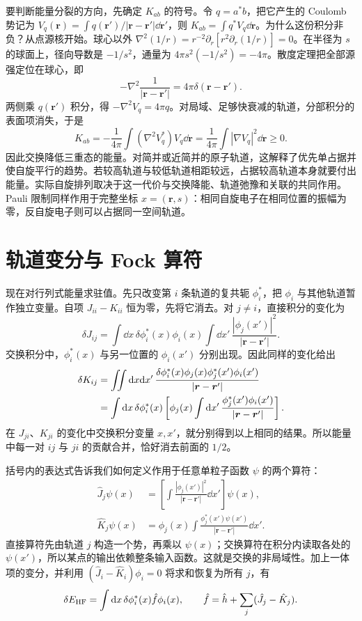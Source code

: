 要判断能量分裂的方向，先确定 $K_{ab}$ 的符号。令 $q=a^*b$，把它产生的 Coulomb 势记为 $V_q(\bm r)=\int q(\bm r')/|\bm r-\bm r'|\dd\bm r'$，则 $K_{ab}=\int q^*V_q\dd\bm r$。为什么这份积分非负？从点源核开始。球心以外 $\nabla^2(1/r)=r^{-2}\partial_r[r^2\partial_r(1/r)]=0$。在半径为 $s$ 的球面上，径向导数是 $-1/s^2$，通量为 $4\pi s^2(-1/s^2)=-4\pi$。散度定理把全部源强定位在球心，即
\begin{equation}\label{hf:coulomb-kernel}
 -\nabla^2\frac{1}{|\bm r-\bm r'|}=4\pi\delta(\bm r-\bm r').
\end{equation}
两侧乘 $q(\bm r')$ 积分，得 $-\nabla^2V_q=4\pi q$。对局域、足够快衰减的轨道，分部积分的表面项消失，于是
\begin{equation}
K_{ab}=-\frac1{4\pi}\int(\nabla^2V_q^*)V_q\dd\bm r
=\frac1{4\pi}\int|\nabla V_q|^2\dd\bm r\ge0.
\end{equation}
因此交换降低三重态的能量。对简并或近简并的原子轨道，这解释了优先单占据并使自旋平行的趋势。若较高轨道与较低轨道相距较远，占据较高轨道本身就要付出能量。实际自旋排列取决于这一代价与交换降能、轨道弛豫和关联的共同作用。Pauli 限制同样作用于完整坐标 $x=(\bm r,s)$：相同自旋电子在相同位置的振幅为零，反自旋电子则可以占据同一空间轨道。

\section{轨道变分与 Fock 算符}
现在对行列式能量求驻值。先只改变第 $i$ 条轨道的复共轭 $\phi_i^*$，把 $\phi_i$ 与其他轨道暂作独立变量。自项 $J_{ii}-K_{ii}$ 恒为零，先将它消去。对 $j\ne i$，直接积分的变化为
\begin{equation}
\delta J_{ij}=\int\dd x\,\delta\phi_i^*(x)\phi_i(x)
\int\dd x'\,\frac{|\phi_j(x')|^2}{|\bm r-\bm r'|}.
\end{equation}
交换积分中，$\phi_i^*(x)$ 与另一位置的 $\phi_i(x')$ 分别出现。因此同样的变化给出
\begin{align}
\delta K_{ij}
&=\iint\mathrm{d} x\mathrm{d} x'\,
\frac{\delta\phi_i^*(x)\phi_j(x)\phi_j^*(x')\phi_i(x')}{|\bm r-\bm r'|}\notag\\
&=\int\mathrm{d} x\,\delta\phi_i^*(x)
\left[\phi_j(x)\int\mathrm{d} x'\,\frac{\phi_j^*(x')\phi_i(x')}{|\bm r-\bm r'|}\right].
\end{align}
在 $J_{ji}$、$K_{ji}$ 的变化中交换积分变量 $x,x'$，就分别得到以上相同的结果。所以能量中每一对 $ij$ 与 $ji$ 的贡献合并，恰好消去前面的 $1/2$。

括号内的表达式告诉我们如何定义作用于任意单粒子函数 $\psi$ 的两个算符：
\begin{align}
\hat J_j\psi(x)&=\left[\int\frac{|\phi_j(x')|^2}{|\bm r-\bm r'|}\dd x'\right]\psi(x),\\
\hat K_j\psi(x)&=\phi_j(x)\int\frac{\phi_j^*(x')\psi(x')}{|\bm r-\bm r'|}\dd x'.
\end{align}
直接算符先由轨道 $j$ 构造一个势，再乘以 $\psi(x)$；交换算符在积分内读取各处的 $\psi(x')$，所以某点的输出依赖整条输入函数。这就是交换的非局域性。加上一体项的变分，并利用 $(\hat J_i-\hat K_i)\phi_i=0$ 将求和恢复为所有 $j$，有
\begin{equation}
\delta E_{\rm HF}=\int\mathrm{d} x\,\delta\phi_i^*(x)\hat f\phi_i(x),\qquad
\hat f=\hat h+\sum_j(\hat J_j-\hat K_j).
\end{equation}

